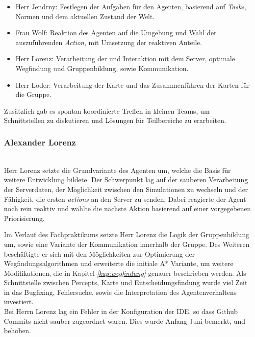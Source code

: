 \begin{itemize}
    \item Herr Jendrny: Festlegen der Aufgaben für den Agenten, basierend auf \textit{Tasks}, Normen und dem aktuellen Zustand der Welt.  
    \item Frau Wolf: Reaktion des Agenten auf die Umgebung und Wahl der auszuführenden \textit{Action}, mit Umsetzung der reaktiven Anteile.
    \item Herr Lorenz: Verarbeitung der \Percepts und Interaktion mit dem Server, optimale Wegfindung und Gruppenbildung, sowie Kommunikation.
    \item Herr Loder: Verarbeitung der Karte und das Zusammenführen der Karten für die Gruppe.
\end{itemize}

Zusätzlich gab es spontan koordinierte Treffen in kleinen Teams, um Schnittstellen zu diskutieren und Lösungen für Teilbereiche zu erarbeiten. 

\subsubsection{Alexander Lorenz} ~\\
Herr Lorenz setzte die Grundvariante des Agenten um, welche die Basis für weitere Entwicklung bildete. Der Schwerpunkt lag auf der sauberen Verarbeitung der Serverdaten, der Möglichkeit zwischen den Simulationen zu wechseln und der Fähigkeit, die ersten \textit{actions} an den Server zu senden. Dabei reagierte der Agent noch rein reaktiv und wählte die nächste Aktion basierend auf einer vorgegebenen Priorisierung. \newline

Im Verlauf des Fachpraktikums setzte Herr Lorenz die Logik der Gruppenbildung um, sowie eine Variante der Kommunikation innerhalb der Gruppe. Des Weiteren beschäftigte er sich mit den Möglichkeiten zur Optimierung der Wegfindungsalgorithmen und erweiterte die initiale A* Variante, um weitere Modifikationen, die in Kapitel \textit{\ref{kap:wegfindung}} genauer beschrieben werden. Als Schnittstelle zwischen Percepts, Karte und Entscheidungsfindung wurde viel Zeit in das Bugfixing, Fehlersuche, sowie die Interpretation des Agentenverhaltens investiert. \\

Bei Herrn Lorenz lag ein Fehler in der Konfiguration der IDE, so dass Github Commits nicht sauber zugeordnet waren. Dies wurde Anfang Juni bemerkt, und behoben.  

